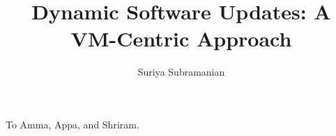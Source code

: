 \title{Dynamic Software Updates: A VM-Centric Approach}
\author{Suriya Subramanian}
\address{%
``Sri Ram Nilayam''                        \\
Plot No. 12, C R Ramakrishnan Puram (East) \\
Virugambakkam                              \\
Chennai - 600 092                          \\
Tamil Nadu                                 \\
India}

\copyrightpage
\commcertpage
\titlepage
\begin{dedication}
To Amma, Appa, and Shriram.
\end{dedication}


\utabstract

\tableofcontents
\listoftables
\listoffigures
